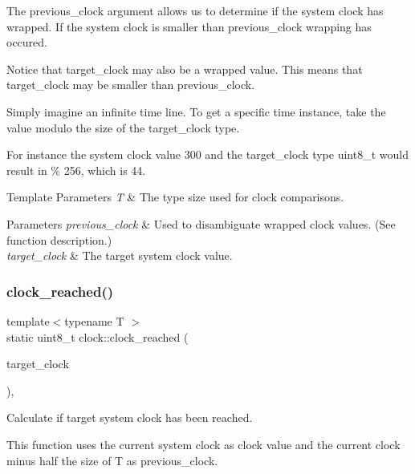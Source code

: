 The previous\+\_\+clock argument allows us to determine if the system clock has wrapped. If the system clock is smaller than previous\+\_\+clock wrapping has occured.

Notice that target\+\_\+clock may also be a wrapped value. This means that target\+\_\+clock may be smaller than previous\+\_\+clock.

Simply imagine an infinite time line. To get a specific time instance, take the value modulo the size of the target\+\_\+clock type.

For instance the system clock value 300 and the target\+\_\+clock type uint8\+\_\+t would result in { \% 256}, which is 44.


\begin{DoxyTemplParams}{Template Parameters}
{\em T} & The type size used for clock comparisons. \\
\hline
\end{DoxyTemplParams}

\begin{DoxyParams}{Parameters}
{\em previous\+\_\+clock} & Used to disambiguate wrapped clock values. (See function description.) \\
\hline
{\em target\+\_\+clock} & The target system clock value. \\
\hline
\end{DoxyParams}
\hypertarget{namespaceclock_a240d81de9119f92701aa5f26555972c4}{}\label{namespaceclock_a240d81de9119f92701aa5f26555972c4} 
\subsubsection{\texorpdfstring{clock\+\_\+reached()}{clock\_reached()}\hspace{0.1cm}{\footnotesize\ttfamily [3/3]}}
{\footnotesize\ttfamily template$<$typename T $>$ \\
static uint8\+\_\+t clock\+::clock\+\_\+reached (\begin{DoxyParamCaption}\item[{const T \&}]{target\+\_\+clock }\end{DoxyParamCaption})\hspace{0.3cm}{\ttfamily [inline]}, {\ttfamily [static]}}



Calculate if target system clock has been reached. 

This function uses the current system clock as clock value and the current clock minus half the size of T as previous\+\_\+clock.

